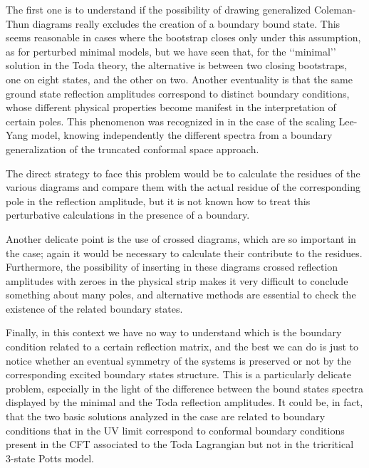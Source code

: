\documentclass[a4paper,12pt]{report}
\begin{document}
The first one is to understand if the possibility of drawing generalized Coleman-Thun diagrams really excludes the
creation of a boundary bound state. This seems reasonable in cases where the bootstrap closes only under this
assumption, as for perturbed minimal models, but we have seen that, for the \lq\lq minimal\rq\rq \, solution in
the \coordHE{} Toda theory, the alternative is between two closing bootstraps, one on eight states, and the other on
two. Another eventuality is that the same ground state reflection amplitudes correspond to distinct boundary
conditions, whose different physical properties become manifest in the interpretation of certain poles. This
phenomenon was recognized in \cite{tateo} in the case of the scaling Lee-Yang model, knowing independently the
different spectra from a boundary generalization of the truncated conformal space approach.

The direct strategy to face this problem would be to calculate the residues of the various diagrams and compare
them with the actual residue of the corresponding pole in the reflection amplitude, but it is not known how to
treat this perturbative calculations in the presence of a boundary.

Another delicate point is the use of crossed diagrams, which are so important in the \coordHE{} case; again it would
be necessary to calculate their contribute to the residues. Furthermore, the possibility of inserting in these
diagrams crossed reflection amplitudes with zeroes in the physical strip makes it very difficult to conclude
something about many poles, and alternative methods are essential to check the existence of the related boundary
states.

Finally, in this context we have no way to understand which is the boundary condition related to a certain
reflection matrix, and the best we can do is just to notice whether an eventual symmetry of the systems is
preserved or not by the corresponding excited boundary states structure. This is a particularly delicate problem,
especially in the light of the difference between the bound states spectra displayed by the minimal and the Toda
reflection amplitudes. It could be, in fact, that the two basic solutions analyzed in the \coordHE{} case are
related to boundary conditions that in the UV limit correspond to conformal boundary conditions present in the CFT
associated to the Toda Lagrangian but not in the tricritical 3-state Potts model.

\vspace{0.5cm}
\end{document}
